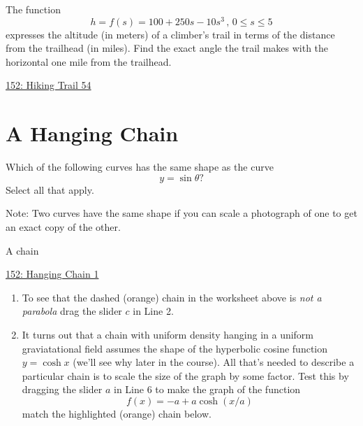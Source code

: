 \documentclass{ximera}
\begin{document}
\begin{question} \label{QOIIdfsdftt444}
The function
\[
 h = f(s) =100+ 250s-10s^3 \, , \, 0\leq s \leq 5
\]
expresses the altitude (in meters) of a climber's trail in terms of the distance from the trailhead (in miles). Find the exact angle the trail makes with the horizontal one mile from the trailhead.

\begin{onlineOnly}
    \begin{center}
\end{center}
\end{onlineOnly}

\href{https://www.desmos.com/calculator/ljcugfqmee}{152: Hiking Trail 54}

\end{question}


\section{A Hanging Chain}

\begin{question} \label{QJFefexxxwe}
Which of the following curves has the same shape as the curve
\[
    y = \sin\theta?
\]
Select all that apply.

\begin{selectAll}
\end{selectAll}

Note: Two curves have the same shape if you can scale a photograph of one to get an exact copy of the other.

\end{question}

\begin{question} \label{QOdfertr3g}
A chain
\begin{onlineOnly}
    \begin{center}
\end{center}
\end{onlineOnly}

\href{https://www.desmos.com/calculator/tj3dz2cnf0}{152: Hanging Chain 1}


\begin{enumerate} 

\item To see that the dashed (orange) chain in the worksheet above is \emph{not a parabola} drag the slider $c$ in Line 2.

\item It turns out that a chain with uniform density hanging in a uniform graviatational field assumes the shape of the hyperbolic cosine function $y=\cosh x$ (we'll see why later in the course). All that's needed to describe a particular chain is to scale the size of the graph by some factor. Test this by dragging the slider $a$ in Line 6 to make the graph of the function
\[
     f(x) = -a + a\cosh(x/a)
\]
match the highlighted (orange) chain below.
\end{enumerate}

\end{question}
\end{document}
